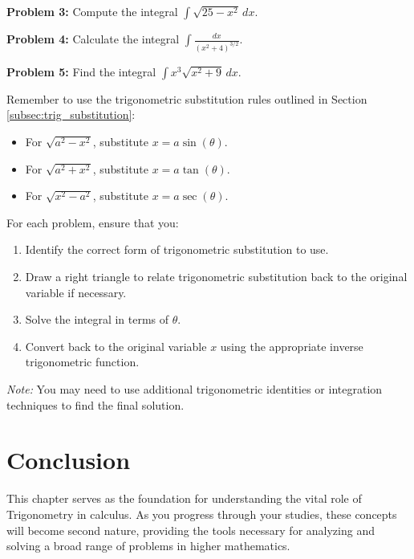 \documentclass[a4paper,12pt]{book}
\newcounter{problem}
\begin{document}
\textbf{Problem 3:}
Compute the integral \( \int \sqrt{25 - x^2} \, dx \).

\textbf{Problem 4:}
Calculate the integral \( \int \frac{dx}{(x^2 + 4)^{3/2}} \).

\textbf{Problem 5:}
Find the integral \( \int x^3\sqrt{x^2 + 9} \, dx \).

Remember to use the trigonometric substitution rules outlined in Section \ref{subsec:trig_substitution}:
\begin{itemize}
    \item For \( \sqrt{a^2 - x^2} \), substitute \( x = a\sin(\theta) \).
    \item For \( \sqrt{a^2 + x^2} \), substitute \( x = a\tan(\theta) \).
    \item For \( \sqrt{x^2 - a^2} \), substitute \( x = a\sec(\theta) \).
\end{itemize}

For each problem, ensure that you:
\begin{enumerate}
    \item Identify the correct form of trigonometric substitution to use.
    \item Draw a right triangle to relate trigonometric substitution back to the original variable if necessary.
    \item Solve the integral in terms of \( \theta \).
    \item Convert back to the original variable \( x \) using the appropriate inverse trigonometric function.
\end{enumerate}

\textit{Note:} You may need to use additional trigonometric identities or integration techniques to find the final solution.


\section*{Conclusion}
\label{sec:trig_conclusion}
This chapter serves as the foundation for understanding the vital role of Trigonometry in calculus. As you progress through your studies, these concepts will become second nature, providing the tools necessary for analyzing and solving a broad range of problems in higher mathematics.


\end{document}
